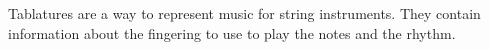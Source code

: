 \documentclass[11pt, a4paper]{article}
\begin{document}
Tablatures are a way to represent music for string instruments. They contain information about the fingering to use to play the notes and the rhythm.





\newpage

\printbibliography%
\end{document}
